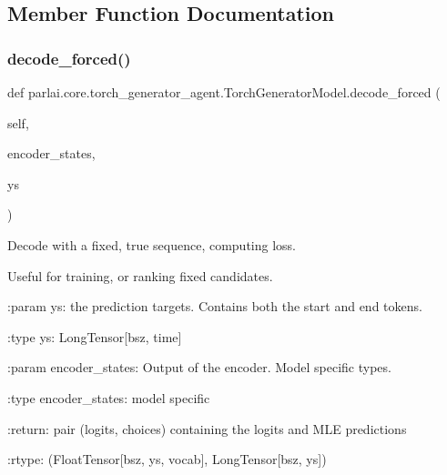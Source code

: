 \subsection{Member Function Documentation}
\mbox{\label{classparlai_1_1core_1_1torch__generator__agent_1_1TorchGeneratorModel_abfc801c11be6fc49dfbc4e70dc6b8ed9}} 
\subsubsection{\texorpdfstring{decode\+\_\+forced()}{decode\_forced()}}
{\footnotesize\ttfamily def parlai.\+core.\+torch\+\_\+generator\+\_\+agent.\+Torch\+Generator\+Model.\+decode\+\_\+forced (\begin{DoxyParamCaption}\item[{}]{self,  }\item[{}]{encoder\+\_\+states,  }\item[{}]{ys }\end{DoxyParamCaption})}

\begin{DoxyVerb}Decode with a fixed, true sequence, computing loss.

Useful for training, or ranking fixed candidates.

:param ys:
    the prediction targets. Contains both the start and end tokens.

:type ys:
    LongTensor[bsz, time]

:param encoder_states:
    Output of the encoder. Model specific types.

:type encoder_states:
    model specific

:return:
    pair (logits, choices) containing the logits and MLE predictions

:rtype:
    (FloatTensor[bsz, ys, vocab], LongTensor[bsz, ys])
\end{DoxyVerb}
 \mbox{\label{classparlai_1_1core_1_1torch__generator__agent_1_1TorchGeneratorModel_a5f1915200b6a8c6518fe17889d2b7cdc}} 
